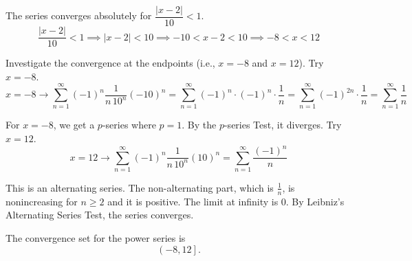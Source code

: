 \documentclass[a4paper, 12pt]{article}
\renewcommand{\headrulewidth}{0pt}
\renewcommand{\headrulewidth}{0pt}
\begin{document}
\begin{enumerate}[leftmargin=*,label=\textbf{\arabic*.}]
The series converges absolutely for $\dfrac{|x-2|}{10}<1$.
\[\frac{|x-2|}{10}<1\implies|x-2|<10\implies-10<x-2<10\implies -8<x<12\]

Investigate the convergence at the endpoints (i.e., $x=-8$ and $x=12$). Try $x=-8$.
\[x=-8\rightarrow\sum_{n=1}^{\infty}(-1)^n\frac1{n\,10^n}(-10)^n=\sum_{n=1}^{\infty}(-1)^n\cdot(-1)^n\cdot\frac1{n}=\sum_{n=1}^{\infty}(-1)^{2n}\cdot\frac1n=\sum_{n=1}^{\infty}\frac1n\]

For $x=-8$, we get a $p$-series where $p=1$. By the $p$-series Test, it diverges. Try $x=12$.
\[x=12\rightarrow\sum_{n=1}^{\infty}(-1)^n\frac1{n\,10^n}(10)^n=\sum_{n=1}^{\infty}\frac{(-1)^n}n\]

This is an alternating series. The non-alternating part, which is $\frac1n$, is nonincreasing for $n\geq2$ and it is positive. The limit at infinity is $0$. By Leibniz's Alternating Series Test, the series converges.

The convergence set for the power series is
\[\boxed{\left(-8,12\right]}.\]

\end{enumerate}

\newpage
{}
{}

\newpage
\pagestyle{fancy}
\renewcommand{\headrulewidth}{1pt}

\end{document}
